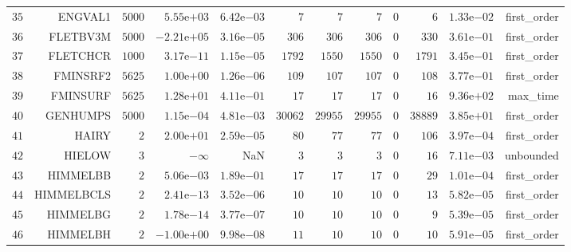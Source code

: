 \begin{longtable}{rrrrrrrrrrrr}
  \(    35\) & ENGVAL1 & \(  5000\) & \( 5.55\)e\(+03\) & \( 6.42\)e\(-03\) & \(     7\) & \(     7\) & \(     7\) & \(     0\) & \(     6\) & \( 1.33\)e\(-02\) & first\_order \\
  \(    36\) & FLETBV3M & \(  5000\) & \(-2.21\)e\(+05\) & \( 3.16\)e\(-05\) & \(   306\) & \(   306\) & \(   306\) & \(     0\) & \(   330\) & \( 3.61\)e\(-01\) & first\_order \\
  \(    37\) & FLETCHCR & \(  1000\) & \( 3.17\)e\(-11\) & \( 1.15\)e\(-05\) & \(  1792\) & \(  1550\) & \(  1550\) & \(     0\) & \(  1791\) & \( 3.45\)e\(-01\) & first\_order \\
  \(    38\) & FMINSRF2 & \(  5625\) & \( 1.00\)e\(+00\) & \( 1.26\)e\(-06\) & \(   109\) & \(   107\) & \(   107\) & \(     0\) & \(   108\) & \( 3.77\)e\(-01\) & first\_order \\
  \(    39\) & FMINSURF & \(  5625\) & \( 1.28\)e\(+01\) & \( 4.11\)e\(-01\) & \(    17\) & \(    17\) & \(    17\) & \(     0\) & \(    16\) & \( 9.36\)e\(+02\) & max\_time \\
  \(    40\) & GENHUMPS & \(  5000\) & \( 1.15\)e\(-04\) & \( 4.81\)e\(-03\) & \( 30062\) & \( 29955\) & \( 29955\) & \(     0\) & \( 38889\) & \( 3.85\)e\(+01\) & first\_order \\
  \(    41\) & HAIRY & \(     2\) & \( 2.00\)e\(+01\) & \( 2.59\)e\(-05\) & \(    80\) & \(    77\) & \(    77\) & \(     0\) & \(   106\) & \( 3.97\)e\(-04\) & first\_order \\
  \(    42\) & HIELOW & \(     3\) & \(-\infty\) &       NaN & \(     3\) & \(     3\) & \(     3\) & \(     0\) & \(    16\) & \( 7.11\)e\(-03\) & unbounded \\
  \(    43\) & HIMMELBB & \(     2\) & \( 5.06\)e\(-03\) & \( 1.89\)e\(-01\) & \(    17\) & \(    17\) & \(    17\) & \(     0\) & \(    29\) & \( 1.01\)e\(-04\) & first\_order \\
  \(    44\) & HIMMELBCLS & \(     2\) & \( 2.41\)e\(-13\) & \( 3.52\)e\(-06\) & \(    10\) & \(    10\) & \(    10\) & \(     0\) & \(    13\) & \( 5.82\)e\(-05\) & first\_order \\
  \(    45\) & HIMMELBG & \(     2\) & \( 1.78\)e\(-14\) & \( 3.77\)e\(-07\) & \(    10\) & \(    10\) & \(    10\) & \(     0\) & \(     9\) & \( 5.39\)e\(-05\) & first\_order \\
  \(    46\) & HIMMELBH & \(     2\) & \(-1.00\)e\(+00\) & \( 9.98\)e\(-08\) & \(    11\) & \(    10\) & \(    10\) & \(     0\) & \(    10\) & \( 5.91\)e\(-05\) & first\_order \\

\end{longtable}
